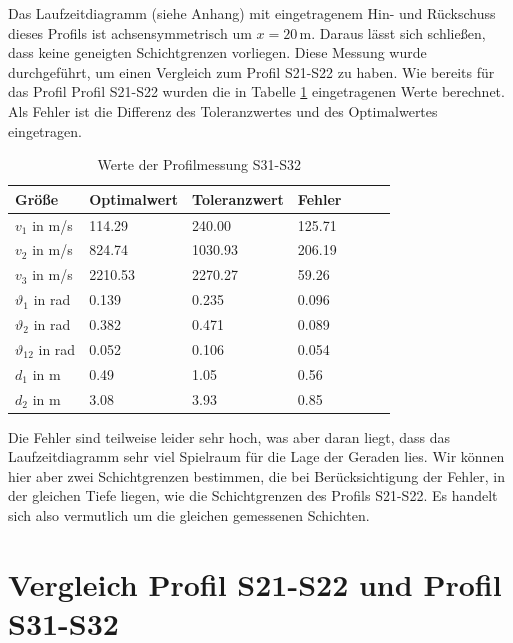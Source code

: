 Das Laufzeitdiagramm (siehe Anhang) mit eingetragenem Hin- und Rückschuss dieses Profils ist achsensymmetrisch um $x=20$\,m. Daraus lässt sich schließen, dass keine geneigten Schichtgrenzen vorliegen.
Diese Messung wurde durchgeführt, um einen Vergleich zum Profil S21-S22 zu haben.
Wie bereits für das Profil Profil S21-S22 wurden die in Tabelle \ref{tab:S31-S32} eingetragenen Werte berechnet. Als Fehler ist die Differenz des Toleranzwertes und des Optimalwertes eingetragen.\\



\begin{table}[!ht]
\centering
\caption{Werte der Profilmessung S31-S32}
\label{tab:S31-S32}
\begin{tabular}{lllllll}
\toprule
Größe   & Optimalwert   & Toleranzwert   & Fehler \\
\midrule
$v_1$ in m/s & 114.29 & 240.00 &  125.71\\
$v_2$ in m/s & 824.74 & 1030.93 & 206.19 \\
$v_3$ in m/s & 2210.53 & 2270.27 & 59.26 \\
$\vartheta_1$ in rad & 0.139 & 0.235 & 0.096  \\
$\vartheta_2$ in rad & 0.382 & 0.471 & 0.089 \\
$\vartheta_{12}$ in rad & 0.052 & 0.106 & 0.054 \\
$d_1$ in m & 0.49 & 1.05 & 0.56 \\
$d_2$ in m & 3.08 & 3.93 & 0.85 \\

\bottomrule
\end{tabular}
\end{table}





Die Fehler sind teilweise leider sehr hoch, was aber daran liegt, dass das Laufzeitdiagramm sehr viel Spielraum für die Lage der Geraden lies. 
Wir können hier aber zwei Schichtgrenzen bestimmen, die bei Berücksichtigung der Fehler, in der gleichen Tiefe liegen, wie die Schichtgrenzen des Profils S21-S22. Es handelt sich also vermutlich um die gleichen gemessenen Schichten.

\section{Vergleich Profil S21-S22 und Profil S31-S32}

